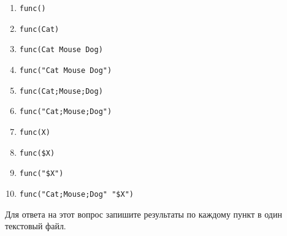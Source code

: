 \documentclass{article}
\begin{document}
\begin{enumerate}
\item \texttt{func()}
\item \texttt{func(Cat)}
\item \texttt{func(Cat Mouse Dog)}
\item \texttt{func("Cat Mouse Dog")}
\item \texttt{func(Cat;Mouse;Dog)}
\item \texttt{func("Cat;Mouse;Dog")}
\item \texttt{func(X)}
\item \texttt{func(\${X})}
\item \texttt{func("\${X}")}
\item \texttt{func("Cat;Mouse;Dog" {} "\${X}")}
\end{enumerate}

Для ответа на этот вопрос запишите результаты по каждому пункт в один текстовый файл.
\end{document}
